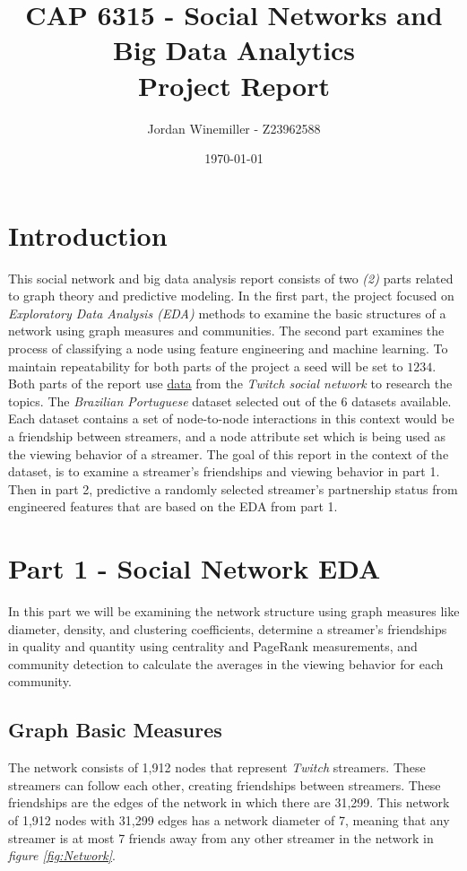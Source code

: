 \documentclass[10pt]{article}
\title{CAP 6315 - Social Networks and Big Data Analytics
\\[1ex] \huge Project Report}
\author{Jordan Winemiller - Z23962588}
\date{\today}
\begin{document}
\maketitle
\doublespacing


\section{Introduction}

This social network and big data analysis report consists of two
\textit{(2)} parts related to graph theory and predictive modeling.
In the first part, the project focused on
\textit{Exploratory Data Analysis (EDA)} methods to examine the
basic structures of a network using graph measures and
communities. The second part examines the process of
classifying a node using feature engineering and machine learning.
To maintain repeatability for both parts of the project a seed will
be set to $1234$.
Both parts of the report use
\href{https://snap.stanford.edu/data/twitch-social-networks.html}
{data} from the \textit{Twitch social network} to research the
topics. The \textit{Brazilian Portuguese} dataset selected out of
the $6$ datasets available. Each dataset contains a set of
node-to-node interactions in this context would be a friendship
between streamers, and a node attribute set which is being
used as the viewing behavior of a streamer.
The goal of this report in the context of the dataset, is to
examine a streamer's friendships and viewing behavior in
part 1. Then in part 2, predictive a randomly selected streamer's
partnership status from engineered features that are based on the
EDA from part 1.


\section{Part 1 - Social Network EDA}

In this part we will be examining the network structure using
graph measures like diameter, density, and clustering coefficients,
determine a streamer's friendships in quality and quantity using
centrality and PageRank measurements, and community detection to
calculate the averages in the viewing behavior for each community.

\subsection{Graph Basic Measures}

\indent The network consists of 1,912 nodes that represent \textit{Twitch} streamers.
These streamers can follow each other, creating friendships
between streamers. These friendships are the edges of the network in which there
are 31,299. This network of 1,912 nodes with 31,299 edges has a network diameter
of 7, meaning that any streamer is at most 7 friends away from any other
streamer in the network in \textit{figure \ref{fig:Network}}.
\end{document}
